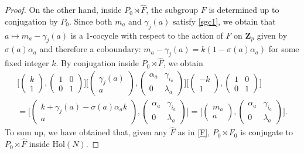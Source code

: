 \documentclass[12pt]{article}
\theoremstyle{definition}
\newcommand{\Z}{\mathbf Z}
\newcommand{\Hol}{\mathrm{Hol}}
\begin{document}
\begin{proof}
On the other hand, inside $P_0\rtimes \hat F$, the subgroup $F$ is determined up to conjugation by $P_0$. Since both $m_a$ and $\gamma_j(a)$ satisfy \eqref{sgc1}, we obtain that $a\mapsto m_a-\gamma_j(a)$ is a 1-cocycle with respect to the action of $F$ on $\Z_p$ given by $\sigma(a)\alpha_a$ and therefore a coboundary:  $m_a-\gamma_j(a)=k(1-\sigma(a)\alpha_a)$ for some fixed integer $k$. By conjugation inside $P_0\rtimes \hat F$, we obtain
		$$\begin{array}{l}
		\Big[\begin{pmatrix}
		k\\
		1
		\end{pmatrix},\begin{pmatrix}
		1 & 0\\
		0&1
		\end{pmatrix}\Big]\Big[\begin{pmatrix}
		\gamma_j(a)\\
		a
		\end{pmatrix},\begin{pmatrix}
		\alpha_a & \gamma_{i_a}\\
		0&\lambda_a
		\end{pmatrix}\Big]
\Big[\begin{pmatrix}
		-k\\
		1
		\end{pmatrix},\begin{pmatrix}
		1 & 0\\
		0&1
		\end{pmatrix}\Big]\\[12pt]
=\Big[\begin{pmatrix}
		k+\gamma_j(a)-\sigma(a)\alpha_a k\\
		a
		\end{pmatrix},\begin{pmatrix}
	\alpha_a & \gamma_{i_a}\\
		0&\lambda_a
		\end{pmatrix}\Big]
=\Big[\begin{pmatrix}
		m_a\\
		a
		\end{pmatrix},\begin{pmatrix}
	\alpha_a & \gamma_{i_a}\\
		0&\lambda_a
		\end{pmatrix}\Big].
        \end{array}
		$$
To sum up, we have obtained that, given any $\hat F$ as in \eqref{F},  $P_0\rtimes F_0$ is conjugate to $P_0\rtimes \hat F$ inside $\Hol(N)$.


\end{proof}
\end{document}
